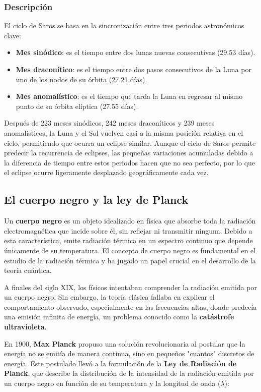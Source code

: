 \documentclass{article}
\begin{document}
\subsubsection{Descripción}

El ciclo de Saros se basa en la sincronización entre tres periodos astronómicos clave:

\begin{itemize}
    \item \textbf{Mes sinódico}: es el tiempo entre dos lunas nuevas consecutivas (29.53 días).
    \item \textbf{Mes draconítico}: es el tiempo entre dos pasos consecutivos de la Luna por uno de los nodos de su órbita (27.21 días).
    \item \textbf{Mes anomalístico}: es el tiempo que tarda la Luna en regresar al mismo punto de su órbita elíptica (27.55 días).
\end{itemize}

Después de 223 meses sinódicos, 242 meses draconíticos y 239 meses anomalísticos, la Luna y el Sol vuelven casi a la misma posición relativa en el cielo, permitiendo que ocurra un eclipse similar. Aunque el ciclo de Saros permite predecir la recurrencia de eclipses, las pequeñas variaciones acumuladas debido a la diferencia de tiempo entre estos periodos hacen que no sea perfecto, por lo que el eclipse ocurre ligeramente desplazado geográficamente cada vez.

\subsection{El cuerpo negro y la ley de Planck}

Un \textbf{cuerpo negro} es un objeto idealizado en física que absorbe toda la radiación electromagnética que incide sobre él, sin reflejar ni transmitir ninguna. Debido a esta característica, emite radiación térmica en un espectro continuo que depende únicamente de su temperatura. El concepto de cuerpo negro es fundamental en el estudio de la radiación térmica y ha jugado un papel crucial en el desarrollo de la teoría cuántica.

A finales del siglo XIX, los físicos intentaban comprender la radiación emitida por un cuerpo negro. Sin embargo, la teoría clásica fallaba en explicar el comportamiento observado, especialmente en las frecuencias altas, donde predecía una emisión infinita de energía, un problema conocido como la \textbf{catástrofe ultravioleta}.

En 1900, \textbf{Max Planck} propuso una solución revolucionaria al postular que la energía no se emitía de manera continua, sino en pequeños "cuantos" discretos de energía. Este postulado llevó a la formulación de la \textbf{Ley de Radiación de Planck}, que describe la distribución de la intensidad de la radiación emitida por un cuerpo negro en función de su temperatura y la longitud de onda (\(\lambda\)):
\end{document}
